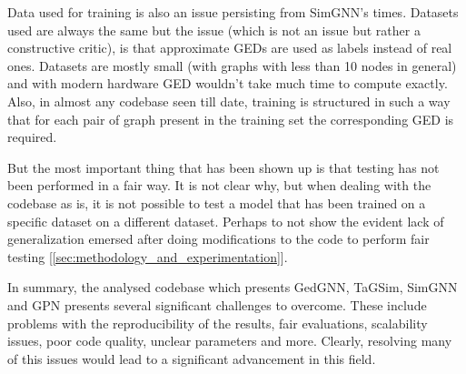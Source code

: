 \documentclass[../Thesis.tex]{subfiles}
\begin{document}
	Data used for training is also an issue persisting from SimGNN's times. Datasets used are always the same but the issue (which is not an issue but rather a constructive critic), is that approximate GEDs are used as labels instead of real ones. Datasets are mostly small (with graphs with less than 10 nodes in general) and with modern hardware GED wouldn't take much time to compute exactly. Also, in almost any codebase seen till date, training is structured in such a way that for each pair of graph present in the training set the corresponding GED is required.
	
	But the most important thing that has been shown up is that testing has not been performed in a fair way. It is not clear why, but when dealing with the codebase as is, it is not possible to test a model that has been trained on a specific dataset on a different dataset. Perhaps to not show the evident lack of generalization emersed after doing modifications to the code to perform fair testing [\autoref{sec:methodology_and_experimentation}].
	
	In summary, the analysed codebase which presents GedGNN, TaGSim, SimGNN and GPN presents several significant challenges to overcome. These include problems with the reproducibility of the results, fair evaluations, scalability issues, poor code quality, unclear parameters and more. Clearly, resolving many of this issues would lead to a significant advancement in this field.
	
\end{document}
